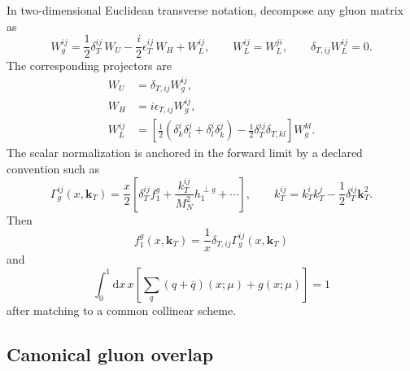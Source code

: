 \documentclass[11pt]{article}
\newcommand{\kT}{\bm{k}_{T}}
\newcommand{\dd}{\mathrm{d}}
\begin{document}
In two-dimensional Euclidean transverse notation, decompose any gluon matrix
as
\begin{equation}
 W_g^{ij}
 =\frac12\delta_T^{ij}\,W_U
 -\frac{i}{2}\epsilon_T^{ij}\,W_H
 +W_L^{ij},
 \qquad
 W_L^{ij}=W_L^{ji},
 \qquad
 \delta_{T,ij}W_L^{ij}=0.
\label{eq:gluon-polarization-decomp}
\end{equation}
The corresponding projectors are
\begin{align}
 W_U&=\delta_{T,ij}W_g^{ij},
\label{eq:gluon-unpol-projector}\\
 W_H&=i\epsilon_{T,ij}W_g^{ij},
\label{eq:gluon-helicity-projector}\\
 W_L^{ij}&=\left[
 \frac12(\delta^i_k\delta^j_l+\delta^i_l\delta^j_k)
 -\frac12\delta_T^{ij}\delta_{T,kl}
 \right]W_g^{kl}.
\label{eq:gluon-linear-projector}
\end{align}
The scalar normalization is anchored in the forward limit by a declared
convention such as
\begin{equation}
 \Gamma_g^{ij}(x,\kT)
 =\frac{x}{2}\left[
 \delta_T^{ij} f_1^g
 +\frac{k_T^{ij}}{M_N^2}h_1^{\perp g}
 +\cdots\right],
 \qquad
 k_T^{ij}=k_T^ik_T^j-\frac12\delta_T^{ij}\kT^2.
\label{eq:gluon-forward-normalization}
\end{equation}
Then
\begin{equation}
 f_1^g(x,\kT)=\frac1x\delta_{T,ij}\Gamma_g^{ij}(x,\kT)
\label{eq:gluon-f1-extraction}
\end{equation}
and
\begin{equation}
 \int_0^1\dd x\,x
 \left[\sum_q(q+\bar q)(x;\mu)+g(x;\mu)\right]=1
\label{eq:momentum-sum-rule}
\end{equation}
after matching to a common collinear scheme.

\subsection{Canonical gluon overlap}
\end{document}
